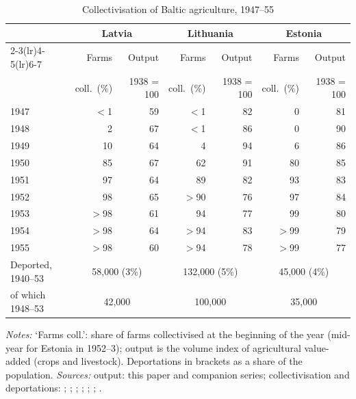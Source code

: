 \begin{table}[htbp]
\centering\footnotesize
\caption{Collectivisation of Baltic agriculture, 1947--55}
\label{tab:collectivisation}
\begin{threeparttable}
\begin{tabular}{lrrrrrr}
\toprule
& \multicolumn{2}{c}{Latvia} & \multicolumn{2}{c}{Lithuania} & \multicolumn{2}{c}{Estonia} \\
\cmidrule(lr){2-3}\cmidrule(lr){4-5}\cmidrule(lr){6-7}
& Farms & Output & Farms & Output & Farms & Output \\
& coll.\ (\%) & 1938 = 100 & coll.\ (\%) & 1938 = 100 & coll.\ (\%) & 1938 = 100 \\
\midrule
1947 & ${<}$1 & 59 & ${<}$1 & 82 & 0 & 81 \\
1948 & 2 & 67 & ${<}$1 & 86 & 0 & 90 \\
1949 & 10 & 64 & 4 & 94 & 6 & 86 \\
1950 & 85 & 67 & 62 & 91 & 80 & 85 \\
1951 & 97 & 64 & 89 & 82 & 93 & 83 \\
1952 & 98 & 65 & ${>}$90 & 76 & 97 & 84 \\
1953 & ${>}$98 & 61 & 94 & 77 & 99 & 80 \\
1954 & ${>}$98 & 64 & ${>}$94 & 83 & ${>}$99 & 79 \\
1955 & ${>}$98 & 60 & ${>}$94 & 78 & ${>}$99 & 77 \\
\midrule
Deported, 1940--53 & \multicolumn{2}{c}{58,000 (3\%)} & \multicolumn{2}{c}{132,000 (5\%)} & \multicolumn{2}{c}{45,000 (4\%)} \\
\quad of which 1948--53 & \multicolumn{2}{c}{42,000} & \multicolumn{2}{c}{100,000} & \multicolumn{2}{c}{35,000} \\
\bottomrule
\end{tabular}
\begin{tablenotes}
\footnotesize
\textit{Notes:} `Farms coll.': share of farms collectivised at the beginning of the year (mid-year for Estonia in 1952--3); output is the volume index of agricultural value-added (crops and livestock). Deportations in brackets as a share of the population. \textit{Sources:} output: this paper and companion series; collectivisation and deportations: \textcite[69]{lv_collectiv}; \textcite[241--2]{lv_sovhist02}; \textcite{lv_deportations}; \textcite[471]{Girnius1988}; \textcite{vlekolektyv}; \textcite[265]{taagepera_coll01}; \textcite[12]{deportations_ee}.
\end{tablenotes}
\end{threeparttable}
\end{table}
